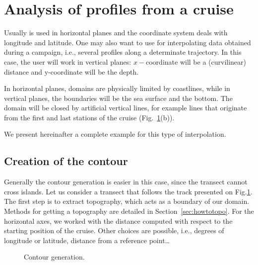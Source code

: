 




\section{Analysis of profiles from a cruise\label{sec:cruise}}

Usually \diva is used in horizontal planes and the coordinate system deals with longitude and latitude. One may also want to use \diva for interpolating data obtained during a campaign, i.e., several profiles along a determinate trajectory. In this case, the user will work in vertical planes: $x-$coordinate will be a (curvilinear) distance and y-coordinate will be the depth.

In horizontal planes, domains are physically limited by coastlines, while in vertical planes, the boundaries will be the sea surface and the bottom. The domain will be closed by artificial vertical lines, for example lines that originate from the first and last stations of the cruise (Fig.~\ref{fig:data}(b)).

We present hereinafter a complete example for this type of interpolation.


\subsection{Creation of the contour}

Generally the contour generation is easier in this case, since the transect cannot cross islands. Let us consider a transect that follows the track presented on Fig.\ref{fig:data}. The first step is to extract topography, which acts as a boundary of our domain. Methods for getting a topography are detailed in Section~\ref{sec:howtotopo}. For the horizontal axes, we worked with the distance computed with respect to the starting position of the cruise. Other choices are possible, i.e., degrees of longitude or latitude, distance from a reference point\ldots

\begin{figure}[htpb]
\centering
{}
\caption{Contour generation.\label{fig:data}}
\end{figure}


